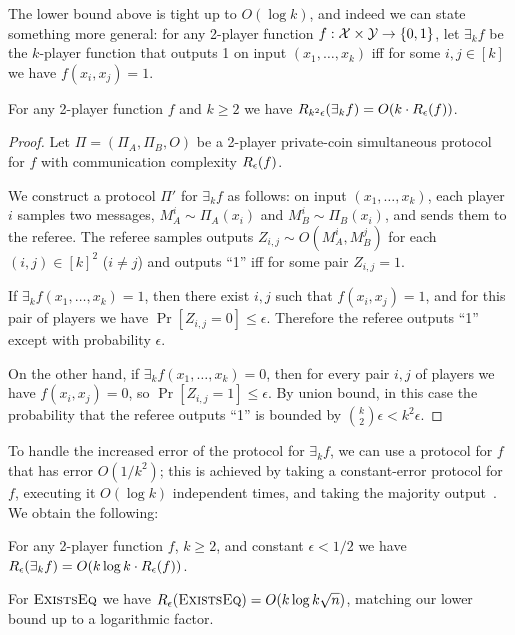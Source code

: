 The lower bound above is tight up to $O(\log k)$, and indeed we can state something more general:
for any 2-player
function $f : \mathcal{X} \times \mathcal{Y} \rightarrow \{ 0,1 \}$,
let $\exists_k f$ be the $k$-player function that outputs 1 on input $(x_1,\ldots,x_k)$ iff for some $i,j \in [k]$ we have $f(x_i,x_j) = 1$.

\begin{lemma}
	For any 2-player function $f$ and $k \geq 2$ we have $R_{k^2 \epsilon} (\exists_k f) = O(k \cdot R_\epsilon(f))$.
	\label{lemma:exists}
\end{lemma}
\begin{proof}
	Let $\Pi = (\Pi_A, \Pi_B, O)$ be a 2-player private-coin simultaneous protocol for $f$ with communication complexity $R_\epsilon(f)$.

	We construct a protocol $\Pi'$ for $\exists_k f$ as follows:
	on input $(x_1,\ldots,x_k)$, each player $i$ samples 
	two messages, $M_A^i \sim \Pi_A(x_i)$ and $M_B^i \sim \Pi_B(x_i)$,
	and sends them to the referee. The referee
	samples outputs $Z_{i,j} \sim O( M_A^i, M_B^j )$ for each $(i,j) \in [k]^2$ ($i\neq j$)
	and
	outputs ``1'' iff for some pair $Z_{i,j} = 1$.

	If $\exists_k f(x_1,\ldots,x_k) = 1$, then there exist $i,j$ such that $f(x_i, x_j) = 1$, and for this pair of players
	we have
		$\Pr\left[ Z_{i,j} = 0 \right] \leq \epsilon$.
	Therefore the referee outputs ``1'' except with probability $\epsilon$.

	On the other hand, if $\exists_k f(x_1,\ldots,x_k) = 0$,
	then for every pair $i,j$ of players we have $f(x_i, x_j) = 0$,
	so
		$\Pr\left[ Z_{i,j} = 1 \right] \leq \epsilon$.
		By union bound, in this case the probability that the referee outputs ``1'' is bounded by ${k \choose 2} \epsilon < k^2 \epsilon$.
\end{proof}


To handle the increased error of the protocol for $\exists_k f$, we can use a protocol for $f$ that has error $O(1/k^2)$;
this is achieved by taking a constant-error protocol for $f$, executing it $O(\log k)$ independent times, and taking the majority output~\cite{KN96}.
We obtain the following:

\begin{theorem}
	For any 2-player function $f$, $k \geq 2$, and constant $\epsilon < 1/2$
	we have $R_{\epsilon} (\exists_k f) = O(k \log k \cdot R_\epsilon(f))$.
	\label{thm:exists}
\end{theorem}
\begin{corollary}
	For $\text{\textsc{ExistsEq}}$ we have
	$R_{\epsilon}(\text{\textsc{ExistsEq}}) = O( k \log k \sqrt{n})$,
	matching our lower bound up to a logarithmic factor.
\end{corollary}
